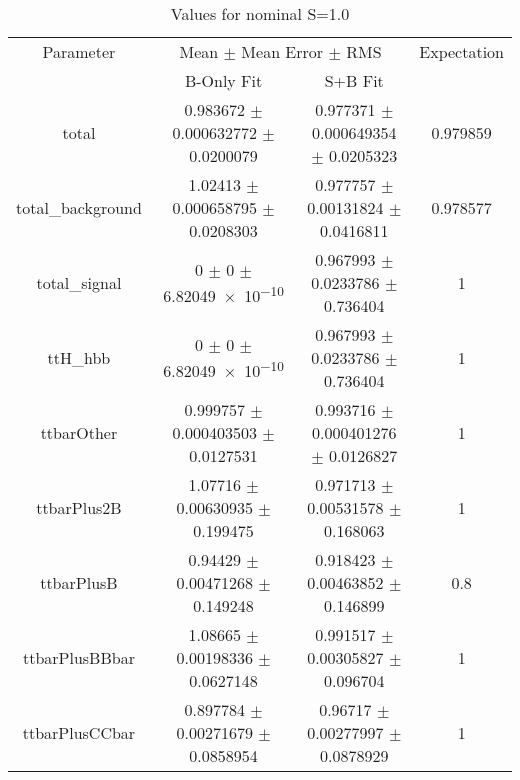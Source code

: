 \begin{table}
\centering
\caption{Values for nominal S=1.0}
\begin{tabular}{cccc}
\toprule
Parameter & \multicolumn{2}{c}{Mean $\pm$ Mean Error $\pm$ RMS} & Expectation\\
 & B-Only Fit & S+B Fit & \\
\midrule
total & \num{0.983672} $\pm$ \num{0.000632772} $\pm$ \num{0.0200079} & \num{0.977371} $\pm$ \num{0.000649354} $\pm$ \num{0.0205323} & \num{0.979859}\\
total\_background & \num{1.02413} $\pm$ \num{0.000658795} $\pm$ \num{0.0208303} & \num{0.977757} $\pm$ \num{0.00131824} $\pm$ \num{0.0416811} & \num{0.978577}\\
total\_signal & \num{0} $\pm$ \num{0} $\pm$ \num{6.82049e-10} & \num{0.967993} $\pm$ \num{0.0233786} $\pm$ \num{0.736404} & \num{1}\\
ttH\_hbb & \num{0} $\pm$ \num{0} $\pm$ \num{6.82049e-10} & \num{0.967993} $\pm$ \num{0.0233786} $\pm$ \num{0.736404} & \num{1}\\
ttbarOther & \num{0.999757} $\pm$ \num{0.000403503} $\pm$ \num{0.0127531} & \num{0.993716} $\pm$ \num{0.000401276} $\pm$ \num{0.0126827} & \num{1}\\
ttbarPlus2B & \num{1.07716} $\pm$ \num{0.00630935} $\pm$ \num{0.199475} & \num{0.971713} $\pm$ \num{0.00531578} $\pm$ \num{0.168063} & \num{1}\\
ttbarPlusB & \num{0.94429} $\pm$ \num{0.00471268} $\pm$ \num{0.149248} & \num{0.918423} $\pm$ \num{0.00463852} $\pm$ \num{0.146899} & \num{0.8}\\
ttbarPlusBBbar & \num{1.08665} $\pm$ \num{0.00198336} $\pm$ \num{0.0627148} & \num{0.991517} $\pm$ \num{0.00305827} $\pm$ \num{0.096704} & \num{1}\\
ttbarPlusCCbar & \num{0.897784} $\pm$ \num{0.00271679} $\pm$ \num{0.0858954} & \num{0.96717} $\pm$ \num{0.00277997} $\pm$ \num{0.0878929} & \num{1}\\
\bottomrule
\end{tabular}
\end{table}